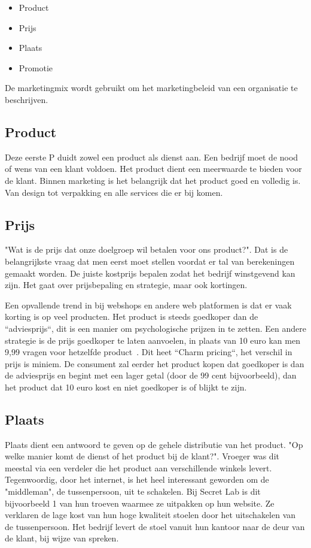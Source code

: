 \begin{itemize}
	\item Product
	\item Prijs
	\item Plaats
	\item Promotie
\end{itemize}

De marketingmix wordt gebruikt om het marketingbeleid van een organisatie te beschrijven. 

\subsection{Product} \label{sec:marketing-product}
Deze eerste P duidt zowel een product als dienst aan. Een bedrijf moet de nood of wens van een klant voldoen. Het product dient een meerwaarde te bieden voor de klant. Binnen marketing is het belangrijk dat het product goed en volledig is. Van design tot verpakking en alle services die er bij komen.
 
\subsection{Prijs} \label{sec:marketing-prijs}
"Wat is de prijs dat onze doelgroep wil betalen voor ons product?". Dat is de belangrijkste vraag dat men eerst moet stellen voordat er tal van berekeningen gemaakt worden. De juiste kostprijs bepalen zodat het bedrijf winstgevend kan zijn. Het gaat over prijsbepaling en strategie, maar ook kortingen.

Een opvallende trend in bij webshops en andere web platformen is dat er vaak korting is op veel producten. Het product is steeds goedkoper dan de ``adviesprijs``, dit is een manier om psychologische prijzen in te zetten. Een andere strategie is de prijs goedkoper te laten aanvoelen, in plaats van 10 euro kan men 9,99 vragen voor hetzelfde product~\autocite{InternetMarketingUniversiteit2016}. Dit heet ``Charm pricing``, het verschil in prijs is miniem. De consument zal eerder het product kopen dat goedkoper is dan de adviesprijs en begint met een lager getal (door de 99 cent bijvoorbeeld), dan het product dat 10 euro kost en niet goedkoper is of blijkt te zijn.

\subsection{Plaats} \label{sec:marketing-plaats}
Plaats dient een antwoord te geven op de gehele distributie van het product. "Op welke manier komt de dienst of het product bij de klant?". Vroeger was dit meestal via een verdeler die het product aan verschillende winkels levert. Tegenwoordig, door het internet, is het heel interessant geworden om de "middleman", de tussenpersoon, uit te schakelen. Bij Secret Lab is dit bijvoorbeeld 1 van hun troeven waarmee ze uitpakken op hun website. Ze verklaren de lage kost van hun hoge kwaliteit stoelen door het uitschakelen van de tussenpersoon. Het bedrijf levert de stoel vanuit hun kantoor naar de deur van de klant, bij wijze van spreken. 

